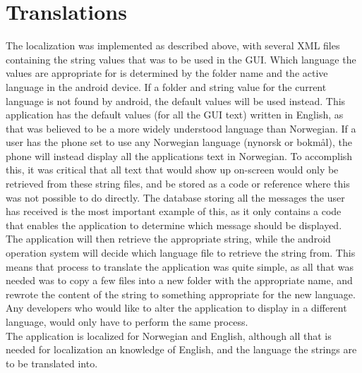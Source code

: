 
\section{Translations}

The localization was implemented as described above, with several XML files containing the string values that was to be used in the GUI.  Which language the values are appropriate for is determined by the folder name and the active language in the android device. If a folder and string value for the current language is not found by android, the default values will be used instead. This application has the default values (for all the GUI text) written in English, as that was believed to be a more widely understood language than Norwegian. If a user has the phone set to use any Norwegian language (nynorsk or bokmål), the phone will instead display all the applications text in Norwegian. To accomplish this, it was critical that all text that would show up on-screen would only be retrieved from these string files, and be stored as a code or reference where this was not possible to do directly. The database storing all the messages the user has received is the most important example of this, as it only contains a code that enables the application to determine which message should be displayed. The application will then retrieve the appropriate string, while the android operation system will decide which language file to retrieve the string from. This means that process to translate the application was quite simple, as all that was needed was to copy a few files into a new folder with the appropriate name, and rewrote the content of the string to something appropriate for the new language. Any developers who would like to alter the application to display in a different language, would only have to perform the same process. \\
The application is localized for Norwegian and English, although all that is needed for localization an knowledge of English, and the language the strings are to be translated into. 